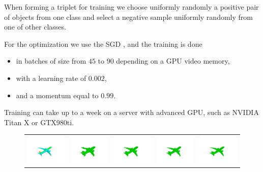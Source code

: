 When forming a triplet for training we choose uniformly randomly a positive pair of objects from one class
and select a negative sample uniformly randomly from one of other classes.

For the optimization we use the SGD \cite{bottou-tricks-2012}, and the training is done
\begin{itemize}
\item in batches of size from $45$ to $90$ depending on a GPU video memory,
\item with a learning rate of $0.002$,
\item and a momentum equal to $0.99$.
\end{itemize}
Training can take up to a week on a server with advanced GPU, such as NVIDIA Titan X or GTX980ti.

\begin{figure}
\centering
\begin{tabular}{ccccc}
  \includegraphics[width=0.19\columnwidth]{Figures/shape_retrieval/pic_airplane_solid.png} &
  \includegraphics[width=0.19\columnwidth]{Figures/shape_retrieval/pic_airplane_30_solid.png} &
  \includegraphics[width=0.19\columnwidth]{Figures/shape_retrieval/pic_airplane_50_solid.png} &
  \includegraphics[width=0.19\columnwidth]{Figures/shape_retrieval/pic_airplane_70_solid.png} &
  \includegraphics[width=0.19\columnwidth]{Figures/shape_retrieval/pic_airplane_100_solid.png} \\

\end{tabular}
\end{figure}
